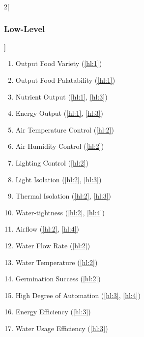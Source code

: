 \documentclass{report}
\begin{document}
\begin{multicols}{2}[\subsubsection{Low-Level}\label{sec:llos}]
    \begin{enumerate}[label=LL\arabic*., ref=LL\arabic*]
        \item \label{ll:1} Output Food Variety \hfill (\ref{hl:1})
        \item \label{ll:2} Output Food Palatability \hfill (\ref{hl:1})
        \item \label{ll:3} Nutrient Output \hfill (\ref{hl:1}, \ref{hl:3})
        \item \label{ll:4} Energy Output \hfill (\ref{hl:1}, \ref{hl:3})
        \item \label{ll:5} Air Temperature Control \hfill (\ref{hl:2})
        \item \label{ll:6} Air Humidity Control \hfill (\ref{hl:2})
        \item \label{ll:8} Lighting Control \hfill (\ref{hl:2})
        \item \label{ll:9} Light Isolation \hfill (\ref{hl:2}, \ref{hl:3})
        \item \label{ll:10} Thermal Isolation \hfill (\ref{hl:2}, \ref{hl:3})
        \item \label{ll:11} Water-tightness \hfill (\ref{hl:2}, \ref{hl:4})
        \item \label{ll:12} Airflow \hfill (\ref{hl:2}, \ref{hl:4})
        \item \label{ll:13} Water Flow Rate \hfill (\ref{hl:2})
        \item \label{ll:14} Water Temperature \hfill (\ref{hl:2})
        \item \label{ll:15} Germination Success \hfill (\ref{hl:2})
        \item \label{ll:16} High Degree of Automation \hfill (\ref{hl:3}, \ref{hl:4})
        \item \label{ll:17} Energy Efficiency \hfill (\ref{hl:3})
        \item \label{ll:18} Water Usage Efficiency \hfill (\ref{hl:3})

\end{enumerate}
\end{multicols}
\end{document}
